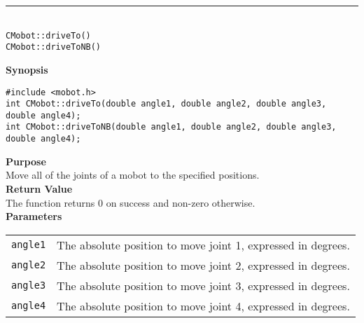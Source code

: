 \noindent
\vspace{5pt}
\rule{4.5in}{0.015in}\\
\noindent
{\LARGE \texttt{CMobot::driveTo()}}\\
{\LARGE \texttt{CMobot::driveToNB()}}\\
{}

\noindent
{\bf Synopsis}
\vspace{-8pt}
\begin{verbatim}
#include <mobot.h>
int CMobot::driveTo(double angle1, double angle2, double angle3, double angle4);
int CMobot::driveToNB(double angle1, double angle2, double angle3, double angle4);
\end{verbatim}

\noindent
{\bf Purpose}\\
Move all of the joints of a mobot to the specified positions.\\

\noindent
{\bf Return Value}\\
The function returns 0 on success and non-zero otherwise.\\

\noindent
{\bf Parameters}\\
\vspace{-0.1in}
\begin{description}
\item               
\begin{tabular}{p{15 mm}p{105 mm}}
\texttt{angle1} & The absolute position to move joint 1, expressed in degrees. \\
\texttt{angle2} & The absolute position to move joint 2, expressed in degrees. \\
\texttt{angle3} & The absolute position to move joint 3, expressed in degrees. \\
\texttt{angle4} & The absolute position to move joint 4, expressed in degrees. \\
\end{tabular}
\end{description}
\noindent

